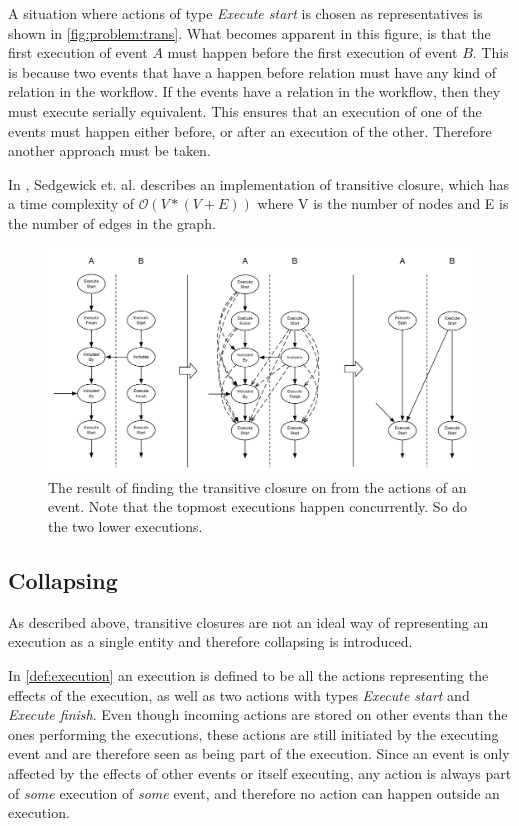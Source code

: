 	A situation where actions of type \textit{Execute start} is chosen as representatives is shown in \autoref{fig:problem:trans}. What becomes apparent in this figure, is that the first execution of event $A$ must happen before the first execution of event $B$. This is because two events that have a happen before relation must have any kind of relation in the workflow. If the events have a relation in the workflow, then they must execute serially equivalent. This ensures that an execution of one of the events must happen either before, or after an execution of the other. Therefore another approach must be taken.
	
	\newpar In \cite{sedgewick2011algorithms}, Sedgewick et. al. describes an implementation of transitive closure, which has a time complexity of $\mathcal{O}(V * (V + E))$ where V is the number of nodes and E is the number of edges in the graph.
	
	\begin{figure}
		\centering
		\includegraphics[width=\textwidth]{5orderofexecution/images/trans.pdf}
		\caption{The result of finding the transitive closure on from the actions of an event. Note that the topmost executions happen concurrently. So do the two lower executions.}
		\label{fig:problem:trans}
	\end{figure}
	
	\subsection{Collapsing}
	As described above, transitive closures are not an ideal way of representing an execution as a single entity and therefore collapsing is introduced.
	
	\newpar In \autoref{def:execution} an execution is defined to be all the actions representing the effects of the execution, as well as two actions with types \textit{Execute start} and \textit{Execute finish}. Even though incoming actions are stored on other events than the ones performing the executions, these actions are still initiated by the executing event and are therefore seen as being part of the execution. Since an event is only affected by the effects of other events or itself executing, any action is always part of \textit{some} execution of \textit{some} event, and therefore no action can happen outside an execution.

